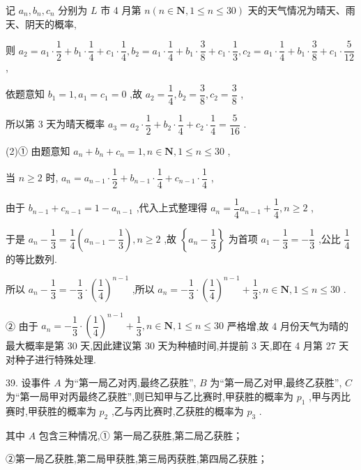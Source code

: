 记 ${a}_{n},{b}_{n},{c}_{n}$ 分别为 $L$ 市 4 月第 $n\left( {n \in  \mathbf{N},1 \leq  n \leq  {30}}\right)$ 天的天气情况为晴天、雨天、阴天的概率,

则 ${a}_{2} = {a}_{1} \cdot  \dfrac{1}{2} + {b}_{1} \cdot  \dfrac{1}{4} + {c}_{1} \cdot  \dfrac{1}{4},{b}_{2} = {a}_{1} \cdot  \dfrac{1}{4} + {b}_{1} \cdot  \dfrac{3}{8} + {c}_{1} \cdot  \dfrac{1}{3},{c}_{2} = {a}_{1} \cdot  \dfrac{1}{4} + {b}_{1} \cdot  \dfrac{3}{8} + {c}_{1} \cdot  \dfrac{5}{12}$ ,

依题意知 ${b}_{1} = 1,{a}_{1} = {c}_{1} = 0$ ,故 ${a}_{2} = \dfrac{1}{4},{b}_{2} = \dfrac{3}{8},{c}_{2} = \dfrac{3}{8}$ ,

所以第 3 天为晴天概率 ${a}_{3} = {a}_{2} \cdot  \dfrac{1}{2} + {b}_{2} \cdot  \dfrac{1}{4} + {c}_{2} \cdot  \dfrac{1}{4} = \dfrac{5}{16}$ .

(2)① 由题意知 ${a}_{n} + {b}_{n} + {c}_{n} = 1,n \in  \mathbf{N},1 \leq  n \leq  {30}$ ,

当 $n \geq  2$ 时, ${a}_{n} = {a}_{n - 1} \cdot  \dfrac{1}{2} + {b}_{n - 1} \cdot  \dfrac{1}{4} + {c}_{n - 1} \cdot  \dfrac{1}{4}$ ,

由于 ${b}_{n - 1} + {c}_{n - 1} = 1 - {a}_{n - 1}$ ,代入上式整理得 ${a}_{n} = \dfrac{1}{4}{a}_{n - 1} + \dfrac{1}{4},n \geq  2$ ,

于是 ${a}_{n} - \dfrac{1}{3} = \dfrac{1}{4}\left( {{a}_{n - 1} - \dfrac{1}{3}}\right) ,n \geq  2$ ,故 $\left\{  {{a}_{n} - \dfrac{1}{3}}\right\}$ 为首项 ${a}_{1} - \dfrac{1}{3} =  - \dfrac{1}{3}$ ,公比 $\dfrac{1}{4}$ 的等比数列.

所以 ${a}_{n} - \dfrac{1}{3} =  - \dfrac{1}{3} \cdot  {\left( \dfrac{1}{4}\right) }^{n - 1}$ ,所以 ${a}_{n} =  - \dfrac{1}{3} \cdot  {\left( \dfrac{1}{4}\right) }^{n - 1} + \dfrac{1}{3},n \in  \mathbf{N},1 \leq  n \leq  {30}$ .

② 由于 ${a}_{n} =  - \dfrac{1}{3} \cdot  {\left( \dfrac{1}{4}\right) }^{n - 1} + \dfrac{1}{3},n \in  \mathbf{N},1 \leq  n \leq  {30}$ 严格增,故 4 月份天气为晴的最大概率是第 30 天,因此建议第 30 天为种植时间,并提前 3 天,即在 4 月第 27 天对种子进行特殊处理.

39. 设事件 $A$ 为“第一局乙对丙,最终乙获胜”, $B$ 为“第一局乙对甲,最终乙获胜”, $C$ 为“第一局甲对丙最终乙获胜”,则已知甲与乙比赛时,甲获胜的概率为 ${p}_{1}$ ,甲与丙比赛时,甲获胜的概率为 ${p}_{2}$ ,乙与丙比赛时,乙获胜的概率为 ${p}_{3}$ .

其中 $A$ 包含三种情况,① 第一局乙获胜,第二局乙获胜；

②第一局乙获胜,第二局甲获胜,第三局丙获胜,第四局乙获胜；

